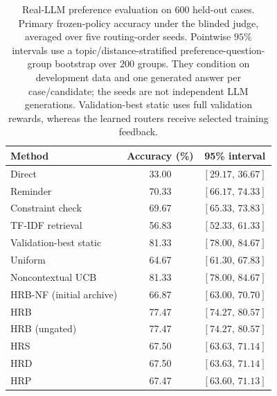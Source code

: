 \begin{table}[!htbp]
\centering
\small
\setlength{\tabcolsep}{4pt}
\caption{Real-LLM preference evaluation on $600$ held-out cases. Primary frozen-policy accuracy under the blinded judge, averaged over five routing-order seeds. Pointwise $95\%$ intervals use a topic/distance-stratified preference-question-group bootstrap over $200$ groups. They condition on development data and one generated answer per case/candidate; the seeds are not independent LLM generations. Validation-best static uses full validation rewards, whereas the learned routers receive selected training feedback.}
\label{tab:llm-prefeval}
\begin{tabular}{lcc}
\toprule
Method & Accuracy (\%) & 95\% interval \\
\midrule
Direct & 33.00 & $[29.17,\,36.67]$ \\
Reminder & 70.33 & $[66.17,\,74.33]$ \\
Constraint check & 69.67 & $[65.33,\,73.83]$ \\
TF-IDF retrieval & 56.83 & $[52.33,\,61.33]$ \\
Validation-best static & 81.33 & $[78.00,\,84.67]$ \\
Uniform & 64.67 & $[61.30,\,67.83]$ \\
Noncontextual UCB & 81.33 & $[78.00,\,84.67]$ \\
HRB-NF (initial archive) & 66.87 & $[63.00,\,70.70]$ \\
HRB & 77.47 & $[74.27,\,80.57]$ \\
HRB (ungated) & 77.47 & $[74.27,\,80.57]$ \\
HRS & 67.50 & $[63.63,\,71.14]$ \\
HRD & 67.50 & $[63.63,\,71.14]$ \\
HRP & 67.47 & $[63.60,\,71.13]$ \\
\bottomrule
\end{tabular}
\end{table}
